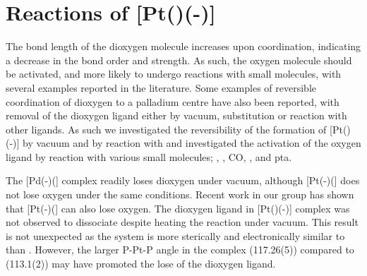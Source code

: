 %
%



\section{Reactions of \texorpdfstring{[Pt(\tButhixantphos)(-)} P]}

The bond length of the dioxygen molecule increases upon coordination, indicating a decrease in the bond order and strength.  As such, the oxygen molecule should be activated, and more likely to undergo reactions with small molecules, with several examples reported in the literature.\cite{Choy1972, Clark1978, Goel1983b, Mimoun1980, Morvillo1986, Qu2014, Sugimoto1982, Valentine1973, Wakatsuki1990}  Some examples of reversible coordination of dioxygen to a palladium centre have also been reported, with removal of the dioxygen ligand either by vacuum, substitution or reaction with other ligands.\cite{Sergeev2010, Valentine1973, Yoshida1979}  As such we investigated the reversibility of the formation of [Pt(\tButhixantphos)(-)] by vacuum and by reaction with  and investigated the activation of the oxygen ligand by reaction with various small molecules; , , CO, ,  and \gls{pta}.

The [Pd(-)(] complex readily loses dioxygen under vacuum, although [Pt(-)(] does not lose oxygen under the same conditions.\cite{Yoshida1979}  Recent work in our group has shown that [Pt(-)(]  can also lose oxygen.  The dioxygen ligand in [Pt(\tButhixantphos)(-)] complex was not observed to dissociate despite heating the reaction under vacuum.  This result is not unexpected as the \tButhixantphos{} system is more sterically and electronically similar to  than .  However, the larger P-Pt-P angle in the \tButhixantphos{} complex (117.26(5)\degrees) compared to  (113.1(2)\degrees) may have promoted the lose of the dioxygen ligand.\cite{Yoshida1979}  

